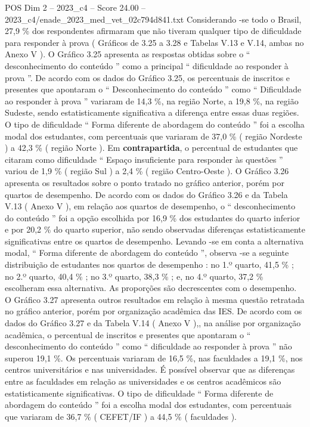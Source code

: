\begin{textsample}{POS Dim 2 – 2023\_c4 – Score 24.00 – 2023\_c4/enade\_2023\_med\_vet\_02c794d841.txt}
Considerando -se todo o Brasil, 27,9 \% dos respondentes afirmaram que não tiveram qualquer tipo de dificuldade para responder à prova ( Gráficos de 3.25 a 3.28 e Tabelas V.13 e V.14, ambas no Anexo V ).
O Gráfico 3.25 apresenta as respostas obtidas sobre o “ desconhecimento do conteúdo ” como a principal “ dificuldade ao responder à prova ”.
De acordo com os dados do Gráfico 3.25, os percentuais de inscritos e presentes que apontaram o “ Desconhecimento do conteúdo ” como “ Dificuldade ao responder à prova ” variaram de 14,3 \%, na região Norte, a 19,8 \%, na região Sudeste, sendo estatisticamente significativa a diferença entre essas duas regiões.
O tipo de dificuldade “ Forma diferente de abordagem do conteúdo ” foi a escolha modal dos estudantes, com percentuais que variaram de 37,0 \% ( região Nordeste ) a 42,3 \% ( região Norte ).
Em \textbf{contrapartida}, o percentual de estudantes que citaram como dificuldade “ Espaço insuficiente para responder às questões ” variou de 1,9 \% ( região Sul ) a 2,4 \% ( região Centro-Oeste ).
O Gráfico 3.26 apresenta os resultados sobre o ponto tratado no gráfico anterior, porém por quartos de desempenho.
De acordo com os dados do Gráfico 3.26 e da Tabela V.13 ( Anexo V ), em relação aos quartos de desempenho, o “ desconhecimento do conteúdo ” foi a opção escolhida por 16,9 \% dos estudantes do quarto inferior e por 20,2 \% do quarto superior, não sendo observadas diferenças estatisticamente significativas entre os quartos de desempenho.
Levando -se em conta a alternativa modal, “ Forma diferente de abordagem do conteúdo ”, observa -se a seguinte distribuição de estudantes nos quartos de desempenho : no 1.º quarto, 41,5 \% ; no 2.º quarto, 40,4 \% ; no 3.º quarto, 38,3 \% ; e, no 4.º quarto, 37,2 \% escolheram essa alternativa.
As proporções são decrescentes com o desempenho.
O Gráfico 3.27 apresenta outros resultados em relação à mesma questão retratada no gráfico anterior, porém por organização acadêmica das IES.
De acordo com os dados do Gráfico 3.27 e da Tabela V.14 ( Anexo V ),, na análise por organização acadêmica, o percentual de inscritos e presentes que apontaram o “ desconhecimento do conteúdo ” como “ dificuldade ao responder à prova ” não superou 19,1 \%.
Os percentuais variaram de 16,5 \%, nas faculdades a 19,1 \%, nos centros universitários e nas universidades.
É possível observar que as diferenças entre as faculdades em relação as universidades e os centros acadêmicos são estatisticamente significativas.
O tipo de dificuldade “ Forma diferente de abordagem do conteúdo ” foi a escolha modal dos estudantes, com percentuais que variaram de 36,7 \% ( CEFET/IF ) a 44,5 \% ( faculdades ).

\end{textsample}
